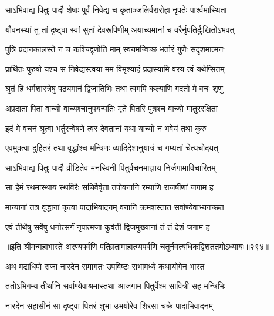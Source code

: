 \begin{center}
\twolineshloka
{साऽभिवाद्य पितुः पादौ शेषाः पूर्वं निवेद्य च}
{कृताञ्जलिर्वरारोहा नृपतेः पार्श्वमास्थिता} %


\twolineshloka
{यौवनस्थां तु तां दृष्ट्वा स्वां सुतां देवरूपिणीम्}
{अयाच्यमानां च वरैर्नृपतिर्दुःखितोऽभवत्} %




\twolineshloka
{पुत्रि प्रदानकालस्ते न च कश्चिद्वृणोति माम्}
{स्वयमन्विच्छ भर्तारं गुणैः सदृशमात्मनः} %


\twolineshloka
{प्रार्थितः पुरुषो यश्च स निवेद्यस्त्वया मम}
{विमृश्याहं प्रदास्यामि वरय त्वं यथेप्सितम्} %


\twolineshloka
{श्रुतं हि धर्मशास्त्रेषु पठ्यमानं द्विजातिभिः}
{तथा त्वमपि कल्याणि गदतो मे वचः शृणु} %


\twolineshloka
{अप्रदाता पिता वाच्यो वाच्यश्चानुपयन्पतिः}
{मृते पितरि पुत्रश्च वाच्यो मातुररक्षिता} %


\twolineshloka
{इदं मे वचनं श्रुत्वा भर्तुरन्वेषणे त्वर}
{देवतानां यथा याच्यो न भवेयं तथा कुरु} %


\twolineshloka
{एवमुक्त्वा दुहितरं तथा वृद्धांश्च मन्त्रिणः}
{व्यादिदेशानुयात्रं च गम्यतां चेत्यचोदयत्} %


\twolineshloka
{साऽभिवाद्य पितुः पादौ व्रीडितेव मनस्विनी}
{पितुर्वचनमाज्ञाय निर्जगामाविचारितम्} %


\twolineshloka
{सा हैमं रथमास्थाय स्थविरैः सचिवैर्वृता}
{तपोवनानि रम्याणि राजर्षीणां जगाम ह} %


\twolineshloka
{मान्यानां तत्र वृद्धानां कृत्वा पादाभिवादनम्}
{वनानि क्रमशस्तात सर्वाण्येवाभ्यगच्छत} %


\twolineshloka
{एवं तीर्थेषु सर्वेषु धनोत्सर्गं नृपात्मजा}
{कुर्वती द्विजमुख्यानां तं तं देशं जगाम ह} %


॥इति श्रीमन्महाभारते अरण्यपर्वणि
पतिव्रतामाहात्म्यपर्वणि चतुर्नवत्यधिकद्विशततमोऽध्यायः॥२९४॥




\twolineshloka
{अथ मद्राधिपो राजा नारदेन समागतः}
{उपविष्टः सभामध्ये कथायोगेन भारत}


\twolineshloka
{ततोऽभिगम्य तीर्थानि सर्वाण्येवाश्रमांस्तथा}
{आजगाम पितुर्वेश्म सावित्री सह मन्त्रिभिः}


\twolineshloka
{नारदेन सहासीनं सा दृष्ट्वा पितरं शुभा}
{उभयोरेव शिरसा चक्रे पादाभिवादनम्}





\end{center}
